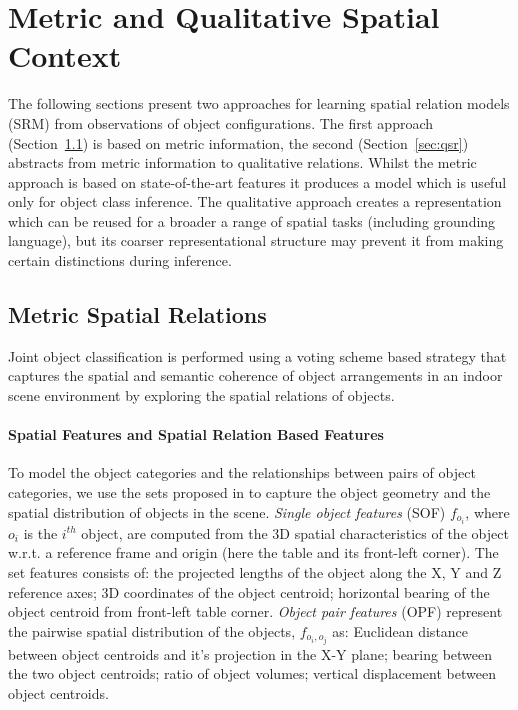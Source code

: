 \documentclass[letterpaper]{article}
\begin{document}

\section{Metric and Qualitative Spatial Context}
\label{sec:Techniques}

The following sections present two approaches for learning spatial relation models (SRM) from observations of object configurations. The first approach (Section~\ref{sec:metric}) is based on metric information, the second (Section~\ref{sec:qsr}) abstracts from metric information to qualitative relations. Whilst the metric approach is based on state-of-the-art features it produces a model which is useful only for object class inference. The qualitative approach creates a representation which can be reused for a broader a range of spatial tasks (including grounding language), but its coarser representational structure may prevent it from making certain distinctions during inference. 

\subsection{Metric Spatial Relations}\label{sec:metric}

Joint object classification is performed using a voting scheme based strategy that captures the spatial and semantic coherence of object arrangements in an indoor scene environment by exploring the spatial relations of objects.

\paragraph{Spatial Features and Spatial Relation Based Features}

To model the object categories and the relationships between pairs of object categories, we use the sets proposed in \cite{alberti:2014} to capture the object geometry and the spatial distribution of objects in the scene. \emph{Single object features} (SOF) $f_{o_{i}}$, where $o_{i}$ is the $i^{th}$ object, are computed from the 3D spatial characteristics of the object w.r.t. a reference frame and origin (here the table and its front-left corner). The set features consists of: the projected lengths of the object along the X, Y and Z reference axes; 3D coordinates of the object centroid; horizontal bearing of the object centroid from front-left table corner. \emph{Object pair features} (OPF) represent the pairwise spatial distribution of the objects, $f_{o_{i},o_{j}}$ as: Euclidean distance between object centroids and it's projection in the X-Y plane; bearing between the two object centroids; ratio of object volumes; vertical displacement between object centroids.
\end{document}
